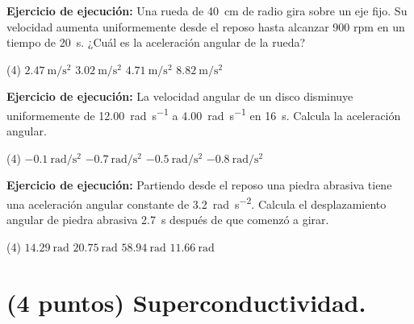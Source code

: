 \documentclass[12pt, letter]{exam}
\begin{document}
\begin{questions}
    \question \label{Ejercicio_01} \textbf{Ejercicio de ejecución: } Una rueda de \SI{40}{\centi\meter} de radio gira sobre un eje fijo. Su velocidad aumenta uniformemente desde el reposo hasta  alcanzar \num{900} rpm en un tiempo de \SI{20}{\second}. ¿Cuál es la aceleración angular de la rueda?
    \begin{tasks}(4)
        \task $\displaystyle \SI[per-mode=fraction]{2.47}{\meter\per\square\second}$
        \task $\displaystyle \SI[per-mode=fraction]{3.02}{\meter\per\square\second}$
        \task $\displaystyle \SI[per-mode=fraction]{4.71}{\meter\per\square\second}$
        \task $\displaystyle \SI[per-mode=fraction]{8.82}{\meter\per\square\second}$
    \end{tasks}
    \question \label{Ejercicio_02} \textbf{Ejercicio de ejecución: } La velocidad angular de un disco disminuye uniformemente de \SI{12.00}{\radian\per\second} a \SI{4.00}{\radian\per\second} en \SI{16}{\second}. Calcula la aceleración angular.
    \begin{tasks}(4)
        \task $\displaystyle -\SI[per-mode=fraction]{0.1}{\radian\per\square\second}$
        \task $\displaystyle -\SI[per-mode=fraction]{0.7}{\radian\per\square\second}$
        \task $\displaystyle -\SI[per-mode=fraction]{0.5}{\radian\per\square\second}$
        \task $\displaystyle -\SI[per-mode=fraction]{0.8}{\radian\per\square\second}$
    \end{tasks}
    \question \label{Ejercicio_03} \textbf{Ejercicio de ejecución: } Partiendo desde el reposo una piedra abrasiva tiene una aceleración angular constante de \SI{3.2}{\radian\per\square\second}. Calcula el desplazamiento angular de piedra abrasiva \SI{2.7}{\second} después de que comenzó a girar.
    \begin{tasks}(4)
        \task $\displaystyle \SI[per-mode=fraction]{14.29}{\radian}$
        \task $\displaystyle \SI[per-mode=fraction]{20.75}{\radian}$
        \task $\displaystyle \SI[per-mode=fraction]{58.94}{\radian}$
        \task $\displaystyle \SI[per-mode=fraction]{11.66}{\radian}$
    \end{tasks}

    \section{(4 puntos) Superconductividad.}


\end{questions}
\end{document}
